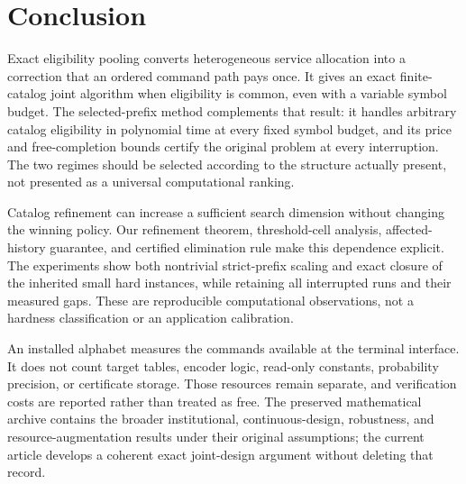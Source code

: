 \section{Conclusion}
Exact eligibility pooling converts heterogeneous service allocation into a correction that an ordered command path pays once. It gives an exact finite-catalog joint algorithm when eligibility is common, even with a variable symbol budget. The selected-prefix method complements that result: it handles arbitrary catalog eligibility in polynomial time at every fixed symbol budget, and its price and free-completion bounds certify the original problem at every interruption. The two regimes should be selected according to the structure actually present, not presented as a universal computational ranking.

Catalog refinement can increase a sufficient search dimension without changing the winning policy. Our refinement theorem, threshold-cell analysis, affected-history guarantee, and certified elimination rule make this dependence explicit. The experiments show both nontrivial strict-prefix scaling and exact closure of the inherited small hard instances, while retaining all interrupted runs and their measured gaps. These are reproducible computational observations, not a hardness classification or an application calibration.

An installed alphabet measures the commands available at the terminal interface. It does not count target tables, encoder logic, read-only constants, probability precision, or certificate storage. Those resources remain separate, and verification costs are reported rather than treated as free. The preserved mathematical archive contains the broader institutional, continuous-design, robustness, and resource-augmentation results under their original assumptions; the current article develops a coherent exact joint-design argument without deleting that record.
